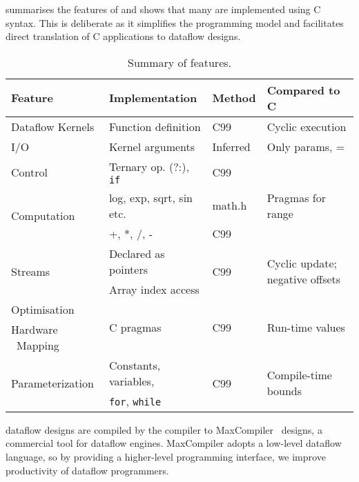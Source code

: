  summarises the features of \FAST{} and
shows that many are implemented using C syntax. This is
deliberate as it simplifies the programming model and facilitates
direct translation of C applications to dataflow designs.

\begin{table}[!h]
 {\small
  \centering
  \renewcommand{\arraystretch}{1.4}
  \begin{tabularx}{\linewidth}{X|X|p{1.4cm}|X}
    \hline
    \bf{Feature}                        & \bf{Implementation}              & \bf{Method}   & \textbf{Compared to C}      \\
    \hline\hline
    Dataflow Kernels & Function definition & C99 & Cyclic execution \\
    \hline
    I/O                               & Kernel arguments              & Inferred        &  Only params, =  \\
    \hline
    Control                           & Ternary op. (?:), \texttt{if} & C99             &     \\
    \hline
    \multirow{2}{*}{Computation}        & log, exp, sqrt, sin etc.                     & math.h           & Pragmas for range      \\
    &  +, *, /, -     & C99         \\
    \hline
    \multirow{2}{*}{Streams}          & Declared as pointers          & \multirow{2}{*}{C99} &  \multirow{2}{3cm}{Cyclic update; negative offsets } \\
    & Array index access     &                      \\
    \hline
    Optimisation                      & \multirow{2}{*}{C pragmas}    & \multirow{2}{*}{C99} & \multirow{2}{*}{Run-time values}\\
    Hardware \  Mapping               &                               &                      & \\
    \hline
    \multirow{2}{*}{Parameterization} & Constants, variables,         & \multirow{2}{*}{C99}  & \multirow{2}{*}{Compile-time bounds} \\
    & \texttt{for}, \texttt{while}  &                     &  \\
  \end{tabularx}
  \caption{Summary of \FAST{} features.}
  \label{table:fast-features}
}
\end{table}


\FAST{} dataflow designs are compiled by the \fastc{} compiler to
MaxCompiler~\cite{5719584} designs, a commercial tool for dataflow
engines. MaxCompiler adopts a low-level dataflow language, so by
providing a higher-level programming interface, we improve
productivity of dataflow programmers.

